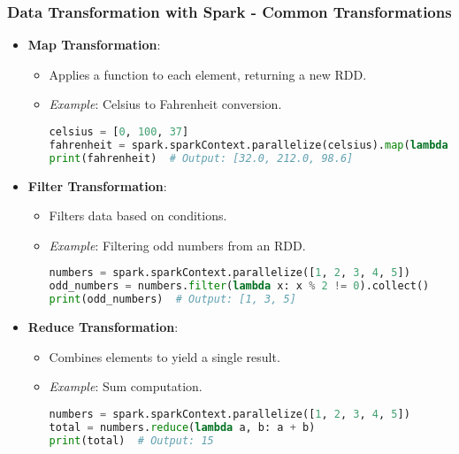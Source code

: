\documentclass[aspectratio=169]{beamer}
\begin{document}
\begin{frame}[fragile]
    \frametitle{Data Transformation with Spark - Common Transformations}
    \begin{itemize}
        \item \textbf{Map Transformation}:
            \begin{itemize}
                \item Applies a function to each element, returning a new RDD.
                \item \textit{Example}: Celsius to Fahrenheit conversion.
                \begin{lstlisting}[language=Python]
celsius = [0, 100, 37]
fahrenheit = spark.sparkContext.parallelize(celsius).map(lambda c: (c * 9/5) + 32).collect()
print(fahrenheit)  # Output: [32.0, 212.0, 98.6]
                \end{lstlisting}
            \end{itemize}
        \item \textbf{Filter Transformation}:
            \begin{itemize}
                \item Filters data based on conditions.
                \item \textit{Example}: Filtering odd numbers from an RDD.
                \begin{lstlisting}[language=Python]
numbers = spark.sparkContext.parallelize([1, 2, 3, 4, 5])
odd_numbers = numbers.filter(lambda x: x % 2 != 0).collect()
print(odd_numbers)  # Output: [1, 3, 5]
                \end{lstlisting}
            \end{itemize}
        \item \textbf{Reduce Transformation}:
            \begin{itemize}
                \item Combines elements to yield a single result.
                \item \textit{Example}: Sum computation.
                \begin{lstlisting}[language=Python]
numbers = spark.sparkContext.parallelize([1, 2, 3, 4, 5])
total = numbers.reduce(lambda a, b: a + b)
print(total)  # Output: 15
                \end{lstlisting}
            \end{itemize}
    \end{itemize}
\end{frame}
\end{document}
